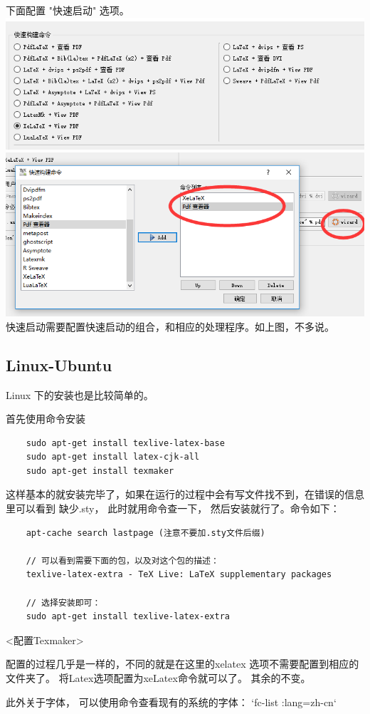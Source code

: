 \documentclass[UTF8]{book}
\begin{document}
{下面配置 "快速启动" 选项。\\
\includegraphics[width=6.0in]{2.png}\\
\includegraphics[width=6.0in]{3.png}\\
快速启动需要配置快速启动的组合，和相应的处理程序。如上图，不多说。

\subsection{Linux-Ubuntu}
Linux 下的安装也是比较简单的。

首先使用命令安装
 \begin{lstlisting}
	sudo apt-get install texlive-latex-base 
	sudo apt-get install latex-cjk-all 
	sudo apt-get install texmaker
 \end{lstlisting}

 这样基本的就安装完毕了，如果在运行的过程中会有写文件找不到，在错误的信息里可以看到 缺少.sty， 此时就用命令查一下， 然后安装就行了。命令如下：
  \begin{lstlisting}
	apt-cache search lastpage (注意不要加.sty文件后缀)

	// 可以看到需要下面的包，以及对这个包的描述：
	texlive-latex-extra - TeX Live: LaTeX supplementary packages

	// 选择安装即可：
	sudo apt-get install texlive-latex-extra

 \end{lstlisting}
	
	{\Large{<配置Texmaker>}}
	
	配置的过程几乎是一样的，不同的就是在这里的xelatex 选项不需要配置到相应的文件夹了。
	将Latex选项配置为xeLatex命令就可以了。
	其余的不变。	
	
	此外关于字体， 可以使用命令查看现有的系统的字体： `fc-list :lang=zh-cn`
}
\vspace*{4em}
\end{document}
